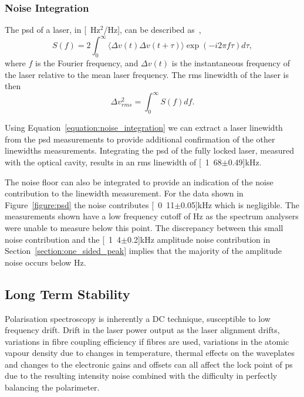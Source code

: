 \subsubsection{Noise Integration}

The \gls{psd} of a laser, in \unit[Hz$^2$/Hz], can be described as~\cite{turner_frequency_2002},
\begin{equation}
S(f)=2\int_0^\infty \langle\Delta v(t)\Delta v(t+\tau)\rangle\exp(-i2\pi f \tau)d\tau,
\end{equation}
where $f$ is the Fourier frequency, and $\Delta v (t)$ is the instantaneous frequency of the laser relative to the mean laser frequency.
The \gls{rms} linewidth of the laser is then
\begin{equation}\label{equation:noise_integration}
\Delta v^2_{rms} = \int_0^\infty S(f) df.
\end{equation}

Using Equation~\ref{equation:noise_integration} we can extract a laser linewidth from the \gls{psd} measurements to provide additional confirmation of the other linewidths measurements.
Integrating the \gls{psd} of the fully locked laser, measured with the optical cavity, results in an \gls{rms} linewidth of \unit[1.68$\pm$0.49]{kHz}.

The noise floor can also be integrated to provide an indication of the noise contribution to the linewidth measurement.
For the data shown in Figure~\ref{figure:psd} the noise contributes \unit[0.11$\pm$0.05]{kHz} which is negligible.
The measurements shown have a low frequency cutoff of \unit[24]{Hz} as the spectrum analysers were unable to measure below this point.
The discrepancy between this small noise contribution and the \unit[1.4$\pm$0.2]{kHz} amplitude noise contribution in Section~\ref{section:one_sided_peak} implies that the majority of the amplitude noise occurs below \unit[24]{Hz}.

\subsection{Long Term Stability}

Polarisation spectroscopy is inherently a DC technique, susceptible to low frequency drift.
Drift in the laser power output as the laser alignment drifts, variations in fibre coupling efficiency if fibres are used, variations in the atomic vapour density due to changes in temperature, thermal effects on the waveplates and changes to the electronic gains and offsets can all affect the lock point of \gls{ps} due to the resulting intensity noise combined with the difficulty in perfectly balancing the polarimeter.

